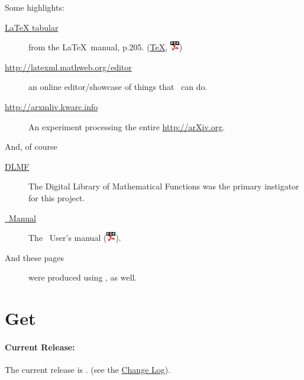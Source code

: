 \documentclass{article}
\newcommand{\PDFIcon}{\includegraphics{pdf}}
\begin{document}
Some highlights:
\begin{description}
\item[\href{examples/tabular/tabular.html}{LaTeX tabular}]
    from the \LaTeX\ manual, p.205.
    (\href{examples/tabular/tabular.tex}{\TeX},
     \href{examples/tabular/tabular.pdf}{\PDFIcon})
\item[\url{http://latexml.mathweb.org/editor}] an online editor/showcase
  of things that \LaTeXML\ can do.
\item[\url{http://arxmliv.kwarc.info}] An experiment processing
  the entire \url{http://arXiv.org}.
\end{description}
And, of course
\begin{description}
\item[\href{http://dlmf.nist.gov/}{DLMF}]
   The Digital Library of Mathematical Functions was the
   primary instigator for this project.
\item[\href{manual/}{\LaTeXML\ Manual}]
   The \LaTeXML\ User's manual (\href{manual.pdf}{\PDFIcon}).
\item[And these pages] were produced using \LaTeXML, as well.
\end{description}

\section{Get \LaTeXML}\label{get}
\paragraph{Current Release:}\label{download.current}
The current release is \CurrentVersion. (see the \href{Changes}{Change Log}).
\end{document}
